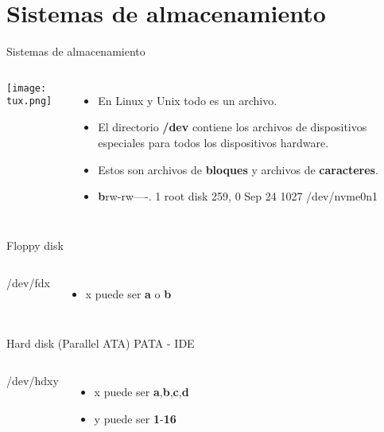 %

\section{Sistemas de almacenamiento}

\begin{frame}[c]{Sistemas de almacenamiento}
  \begin{columns}
      \begin{center}
        \texttt{[image: tux.png]}
      \end{center}
      \begin{itemize}
        \item En Linux y Unix todo es un archivo.
        \pausa
        \item El directorio \textbf{/dev} contiene los archivos de dispositivos
          especiales para todos los dispositivos hardware.
        \pausa
        \item Estos son archivos de \textbf{bloques} y archivos de
          \textbf{caracteres}.
        \pausa
        \item \textbf{b}rw-rw----. 1 root disk 259, 0 Sep 24 1027
          /dev/nvme0n1
    \end{itemize}
  \end{columns}
\end{frame}

\begin{frame}[c]{Floppy disk}

  \begin{columns}
      {\huge /dev/fd{\color{red}x}}
      \begin{itemize}
        \item {\color{red}x} puede ser \textbf{a} o \textbf{b}
      \end{itemize}
  \end{columns}
\end{frame}

\begin{frame}[c]{Hard disk (Parallel ATA) PATA - IDE}

  \begin{columns}
      {\huge /dev/hd{\color{red}x}{\color{blue}y}}
      \begin{itemize}
        \item {\color{red}x} puede ser \textbf{a},\textbf{b},\textbf{c},\textbf{d}
        \item {\color{blue}y} puede ser \textbf{1}-\textbf{16}
      \end{itemize}
  \end{columns}
\end{frame}

